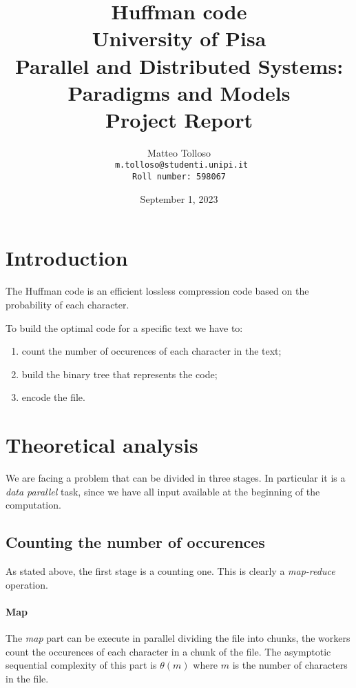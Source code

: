 \documentclass[12pt, letterpaper]{article}  %
\title{\vspace{2cm}\textbf{Huffman code} \\
        \bigskip
        \Large{
            \medskip
            University of Pisa \\
            \medskip
            Parallel and Distributed Systems: Paradigms and Models \\
            \medskip
            Project Report\\
            \medskip
        }
}
\author{
  {Matteo Tolloso}\\
  \texttt{ \scriptsize{m.tolloso@studenti.unipi.it}}\\
  \texttt{\scriptsize{Roll number: 598067}} \\
}
\begin{document}
\nocite{*}
\date{September 1, 2023}
\maketitle

\newpage

\section{Introduction}
The Huffman code is an efficient lossless compression code based on the probability of each character.

To build the optimal code for a specific text we have to:
\begin{enumerate}
    \item count the number of occurences of each character in the text;
    \item build the binary tree that represents the code;
    \item encode the file.
\end{enumerate}

\section{Theoretical analysis}

We are facing a problem that can be divided in three stages. In particular it is a \textit{data parallel} task, 
since we have all input available at the beginning of the computation.

\subsection{Counting the number of occurences}
As stated above, the first stage is a counting one. This is clearly a \textit{map-reduce} operation.

\paragraph*{Map}
The \textit{map} part can be execute in parallel dividing the file into chunks, the workers count the occurences of each character
in a chunk of the file. The asymptotic sequential complexity of this part is $\theta(m)$ where $m$ is the number of characters in the file.
\end{document}
